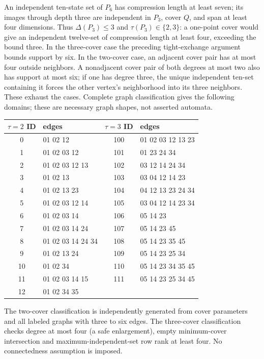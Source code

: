 \documentclass[10pt]{article}
\begin{document}
An independent ten-state set of $P_6$ has compression length at least
seven; its images through depth three are independent in $P_3$, cover
$Q$, and span at least four dimensions. Thus $\Delta(P_3)\le3$ and
$\tau(P_3)\in\{2,3\}$: a one-point cover would give an independent
twelve-set of compression length at least four, exceeding the bound three.
In the three-cover case the preceding tight-exchange
argument bounds support by six. In the two-cover case, an adjacent cover
pair has at most four outside neighbors. A nonadjacent cover pair of
both degrees at most two also has support at most six; if one has degree
three, the unique independent ten-set containing it forces the other
vertex's neighborhood into its three neighbors. These exhaust the cases.
Complete graph classification gives the following domains; these are
necessary graph shapes, not asserted automata.
\begin{center}\small
\begin{tabular}{cl@{\qquad}cl}
$\tau=2$ ID&edges&$\tau=3$ ID&edges\\\hline
0&01 02 12&100&01 02 03 12 13 23\\
1&01 02 03 12&101&01 23 24 34\\
2&01 02 03 12 13&102&03 12 14 24 34\\
3&01 02 13&103&03 04 12 14 23\\
4&01 02 13 23&104&04 12 13 23 24 34\\
5&01 02 03 12 14&105&03 04 12 14 23 34\\
6&01 02 03 14&106&05 14 23\\
7&01 02 03 14 24&107&05 14 23 45\\
8&01 02 03 14 24 34&108&05 14 23 35 45\\
9&01 02 13 24&109&05 14 23 25 34\\
10&01 02 34&110&05 14 23 34 35 45\\
11&01 02 03 14 15&111&05 14 23 25 34 45\\
12&01 02 34 35&&
\end{tabular}
\end{center}
The two-cover classification is independently generated from cover
parameters and all labeled graphs with three to six edges. The three-cover
classification checks degree at most four (a safe enlargement), empty
minimum-cover intersection and maximum-independent-set row rank at least
four. No connectedness assumption is imposed.
\end{document}
